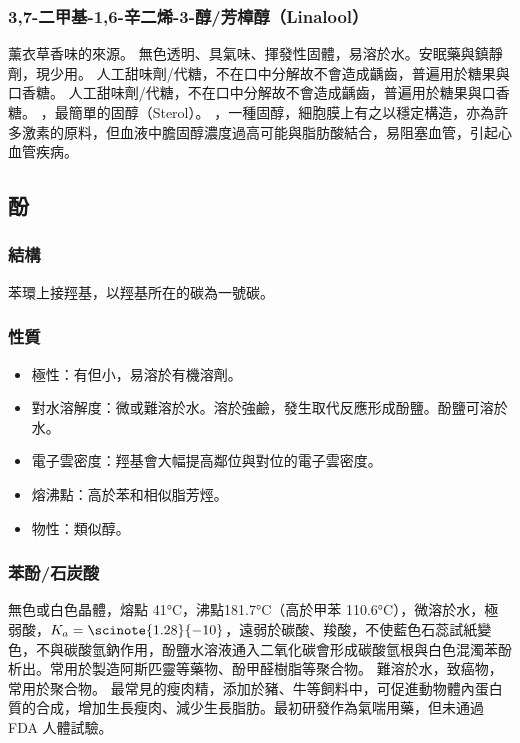 \documentclass[a4paper,12pt]{report}
\begin{document}
\begin{itemize}
\subsubsection{3,7-二甲基-1,6-辛二烯-3-醇/芳樟醇（Linalool）}
薰衣草香味的來源。
無色透明、具氣味、揮發性固體，易溶於水。安眠藥與鎮靜劑，現少用。
人工甜味劑/代糖，不在口中分解故不會造成齲齒，普遍用於糖果與口香糖。
人工甜味劑/代糖，不在口中分解故不會造成齲齒，普遍用於糖果與口香糖。
，最簡單的固醇（Sterol）。
，一種固醇，細胞膜上有之以穩定構造，亦為許多激素的原料，但血液中膽固醇濃度過高可能與脂肪酸結合，易阻塞血管，引起心血管疾病。
\subsection{酚}
\subsubsection{結構}
苯環上接羥基，以羥基所在的碳為一號碳。
\subsubsection{性質}
\begin{itemize}
\item 極性：有但小，易溶於有機溶劑。
\item 對水溶解度：微或難溶於水。溶於強鹼，發生取代反應形成酚鹽。酚鹽可溶於水。 
\item 電子雲密度：羥基會大幅提高鄰位與對位的電子雲密度。
\item 熔沸點：高於苯和相似脂芳烴。
\item 物性：類似醇。
\end{itemize}
\subsubsection{苯酚/石炭酸}
無色或白色晶體，熔點 41°C，沸點181.7°C（高於甲苯 110.6°C），微溶於水，極弱酸，$K_a=\scinote{1.28}{-10}$，遠弱於碳酸、羧酸，不使藍色石蕊試紙變色，不與碳酸氫鈉作用，酚鹽水溶液通入二氧化碳會形成碳酸氫根與白色混濁苯酚析出。常用於製造阿斯匹靈等藥物、酚甲醛樹脂等聚合物。
難溶於水，致癌物，常用於聚合物。
最常見的瘦肉精，添加於豬、牛等飼料中，可促進動物體內蛋白質的合成，增加生長瘦肉、減少生長脂肪。最初研發作為氣喘用藥，但未通過 FDA 人體試驗。

\end{itemize}
\end{document}
